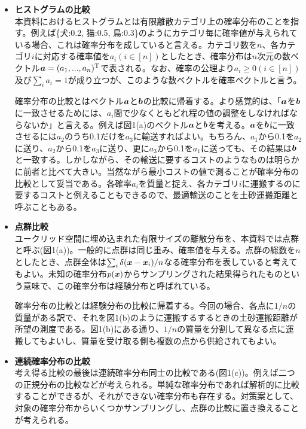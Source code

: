 \documentclass[dvipdfmx, 9pt, a4paper]{jsarticle}
\newcommand{\bm}[1]{{\mbox{\boldmath $#1$}}}
\begin{document}
\begin{itemize}
\item {\bf ヒストグラムの比較}\\
本資料におけるヒストグラムとは有限離散カテゴリ上の確率分布のことを指す。例えば\{犬:0.2, 猫:0.5, 鳥:0.3\}のようにカテゴリ毎に確率値が与えられている場合、これは確率分布を成していると言える。カテゴリ数を$n$、各カテゴリ$i$に対応する確率値を$a_i(i \in [n])$としたとき、確率分布は$n$次元の数ベクトル$\bm a=(a_1, ..., a_n)^{\rm T}$で表される。なお、確率の公理より$a_i \geq 0(i \in [n])$及び$\sum_i a_i=1$が成り立つが、このような数ベクトルを確率ベクトルと言う。\par
確率分布の比較とはベクトル$\bm a$と$\bm b$の比較に帰着する。より感覚的は、「$\bm a$を$\bm b$に一致させるためには、$a_i$間で少なくともどれ程の値の調整をしなければならないか」と言える。例えば図1(a)のベクトル$\bm a$と$\bm b$を考える。$\bm a$を$\bm b$に一致させるには$a_2$のうち0.1だけを$a_3$に輸送すればよい。もちろん、$a_1$から0.1を$a_2$に送り、$a_2$から0.1を$a_3$に送り、更に$a_3$から0.1を$a_1$に送っても、その結果は$\bm b$と一致する。しかしながら、その輸送に要するコストのようなものは明らかに前者と比べて大きい。当然ながら最小コストの値で測ることが確率分布の比較として妥当である。各確率$a_i$を質量と捉え、各カテゴリ$i$に運搬するのに要するコストと例えることもできるので、最適輸送のことを土砂運搬距離と呼ぶこともある。
\item {\bf 点群比較}\\
ユークリッド空間に埋め込まれた有限サイズの離散分布を、本資料では点群と呼ぶ(図1(a))。一般的に点群は同じ重み、確率値を与える。点群の総数を$n$としたとき、点群全体は$\sum_i \delta(\bm x - \bm x_i)/n$なる確率分布を表していると考えてもよい。未知の確率分布$p(\bm x)$からサンプリングされた結果得られたものという意味で、この確率分布は経験分布と呼ばれている。\par
確率分布の比較とは経験分布の比較に帰着する。今回の場合、各点に$1/n$の質量がある訳で、それを図1(b)のように運搬するするときの土砂運搬距離が所望の測度である。図1(b)にある通り、$1/n$の質量を分割して異なる点に運搬してもよいし、質量を受け取る側も複数の点から供給されてもよい。
\item {\bf 連続確率分布の比較}\\
考え得る比較の最後は連続確率分布同士の比較である(図1(c))。例えば二つの正規分布の比較などが考えられる。単純な確率分布であれば解析的に比較することができるが、それができない確率分布も存在する。対策案として、対象の確率分布からいくつかサンプリングし、点群の比較に置き換えることが考えられる。
\end{itemize}\par
\end{document}
